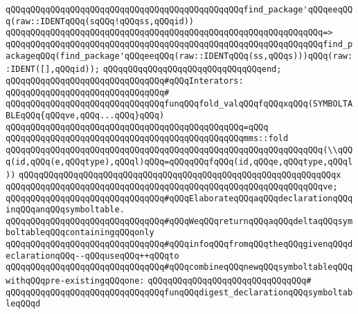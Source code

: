 \newline
\verb|qQQqqQQqqQQqqQQqqQQqqQQqqQQqqQQqqQQqqQQqqQQqqQQqfind_package'qQQqeeqQQq(raw::IDENTqQQq(sqQQq!qQQqss,qQQqid))|\newline
\verb|qQQqqQQqqQQqqQQqqQQqqQQqqQQqqQQqqQQqqQQqqQQqqQQqqQQqqQQqqQQqqQQq=>|\newline
\verb|qQQqqQQqqQQqqQQqqQQqqQQqqQQqqQQqqQQqqQQqqQQqqQQqqQQqqQQqqQQqqQQqfind_packageqQQq(find_package'qQQqeeqQQq(raw::IDENTqQQq(ss,qQQqs)))qQQq(raw::IDENT([],qQQqid));|\newline
\verb|qQQqqQQqqQQqqQQqqQQqqQQqqQQqqQQqend;|\newline
\newline
\verb|qQQqqQQqqQQqqQQqqQQqqQQqqQQqqQQq#qQQqInterators:|\newline
\verb|qQQqqQQqqQQqqQQqqQQqqQQqqQQqqQQq#|\newline
\verb|qQQqqQQqqQQqqQQqqQQqqQQqqQQqqQQqfunqQQqfold_valqQQqfqQQqxqQQq(SYMBOLTABLEqQQq{qQQqve,qQQq...qQQq}qQQq)|\newline
\verb|qQQqqQQqqQQqqQQqqQQqqQQqqQQqqQQqqQQqqQQqqQQqqQQq=qQQq|\newline
\verb|qQQqqQQqqQQqqQQqqQQqqQQqqQQqqQQqqQQqqQQqqQQqqQQqmms::fold|\newline
\verb|qQQqqQQqqQQqqQQqqQQqqQQqqQQqqQQqqQQqqQQqqQQqqQQqqQQqqQQqqQQqqQQq(\\qQQq(id,qQQq(e,qQQqtype),qQQql)qQQq=qQQqqQQqfqQQq(id,qQQqe,qQQqtype,qQQql))|\newline
\verb|qQQqqQQqqQQqqQQqqQQqqQQqqQQqqQQqqQQqqQQqqQQqqQQqqQQqqQQqqQQqqQQqx|\newline
\verb|qQQqqQQqqQQqqQQqqQQqqQQqqQQqqQQqqQQqqQQqqQQqqQQqqQQqqQQqqQQqqQQqve;|\newline
\newline
\newline
\verb|qQQqqQQqqQQqqQQqqQQqqQQqqQQqqQQq#qQQqElaborateqQQqaqQQqdeclarationqQQqinqQQqanqQQqsymboltable.|\newline
\verb|qQQqqQQqqQQqqQQqqQQqqQQqqQQqqQQq#qQQqWeqQQqreturnqQQqaqQQqdeltaqQQqsymboltableqQQqcontainingqQQqonly|\newline
\verb|qQQqqQQqqQQqqQQqqQQqqQQqqQQqqQQq#qQQqinfoqQQqfromqQQqtheqQQqgivenqQQqdeclarationqQQq--qQQquseqQQq++qQQqto|\newline
\verb|qQQqqQQqqQQqqQQqqQQqqQQqqQQqqQQq#qQQqcombineqQQqnewqQQqsymboltableqQQqwithqQQqpre-existingqQQqone:|\newline
\verb|qQQqqQQqqQQqqQQqqQQqqQQqqQQqqQQq#|\newline
\verb|qQQqqQQqqQQqqQQqqQQqqQQqqQQqqQQqfunqQQqdigest_declarationqQQqsymboltableqQQqd|\newline
